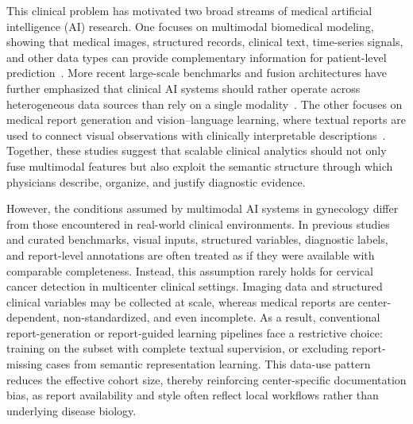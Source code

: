 \documentclass[11pt, a4paper]{article}
\theoremstyle{plain}
\theoremstyle{definition}
\begin{document}
This clinical problem has motivated two broad streams of medical artificial intelligence (AI) research. One focuses on multimodal biomedical modeling, showing that medical images, structured records, clinical text, time-series signals, and other data types can provide complementary information for patient-level prediction~\cite{acosta2022multimodal,moor2023gmai,tu2024generalist_biomedical_ai}. More recent large-scale benchmarks and fusion architectures have further emphasized that clinical AI systems should rather operate across heterogeneous data sources than rely on a single modality~\cite{dai2025climb,aljorf2025medpatch}. The other focuses on medical report generation and vision--language learning, where textual reports are used to connect visual observations with clinically interpretable descriptions~\cite{monshi2020radiology_reports,pang2023medical_report_generation,gu2026radalign}. Together, these studies suggest that scalable clinical analytics should not only fuse multimodal features but also exploit the semantic structure through which physicians describe, organize, and justify diagnostic evidence.

However, the conditions assumed by multimodal AI systems in gynecology differ from those encountered in real-world clinical environments. In previous studies and curated benchmarks, visual inputs, structured variables, diagnostic labels, and report-level annotations are often treated as if they were available with comparable completeness. Instead, this assumption rarely holds for cervical cancer detection in multicenter clinical settings. Imaging data and structured clinical variables may be collected at scale, whereas medical reports are center-dependent, non-standardized, and even incomplete. As a result, conventional report-generation or report-guided learning pipelines face a restrictive choice: training on the subset with complete textual supervision, or excluding report-missing cases from semantic representation learning. This data-use pattern reduces the effective cohort size, thereby reinforcing center-specific documentation bias, as report availability and style often reflect local workflows rather than underlying disease biology.
\end{document}
